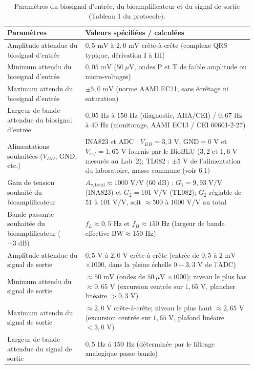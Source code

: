 \documentclass[11pt,letterpaper]{article}
\begin{document}
\begin{table}[H]
\centering
\caption{Paramètres du biosignal d'entrée, du bioamplificateur et du signal de sortie (Tableau 1 du protocole).}
\label{tab:specifications}
\small
\begin{tabular}{p{6.6cm}p{9.0cm}}
\toprule
\textbf{Paramètres} & \textbf{Valeurs spécifiées / calculées} \\
\midrule
Amplitude attendue du biosignal d'entrée & $0,5\text{ mV}$ à $2,0\text{ mV}$ crête-à-crête (complexe QRS typique, dérivation I à III) \\
Minimum attendu du biosignal d'entrée & $0,05\text{ mV}$ ($50\ \mu\text{V}$, ondes P et T de faible amplitude ou micro-voltages) \\
Maximum attendu du biosignal d'entrée & $\pm 5,0\text{ mV}$ (norme AAMI EC11, sans écrêtage ni saturation) \\
Largeur de bande attendue du biosignal d'entrée & $0,05\text{ Hz}$ à $150\text{ Hz}$ (diagnostic, AHA/CEI) / $0,67\text{ Hz}$ à $40\text{ Hz}$ (monitorage, AAMI EC13 / CEI 60601-2-27) \\
Alimentations souhaitées ($V_{DD}$, GND, etc.) & INA823 et ADC : $V_{DD} = 3,3\text{ V}$, $\text{GND} = 0\text{ V}$ et $V_{ref} = 1,65\text{ V}$ fournis par le BioBLU ($3,2$ et $1,6\text{ V}$ mesurés au Lab~2); TL082 : $\pm 5\text{ V}$ de l'alimentation du laboratoire, masse commune (voir 6.1) \\
Gain de tension souhaité du bioamplificateur & $A_{v,\text{total}} \approx 1000\text{ V/V}$ ($60\text{ dB}$) : $G_1 = 9,93\text{ V/V}$ (INA823) et $G_2 = 101\text{ V/V}$ (TL082); $G_2$ réglable de $51$ à $101\text{ V/V}$, soit $\approx 500$ à $1000\text{ V/V}$ au total \\
Bande passante souhaitée du bioamplificateur ($-3\text{ dB}$) & $f_L \approx 0,5\text{ Hz}$ et $f_H \approx 150\text{ Hz}$ (largeur de bande effective $\text{BW} \approx 150\text{ Hz}$) \\
Amplitude attendue du signal de sortie & $0,5\text{ V}$ à $2,0\text{ V}$ crête-à-crête (entrée de $0,5$ à $2\text{ mV}$ $\times 1000$, dans la pleine échelle $0-3,3\text{ V}$ de l'ADC) \\
Minimum attendu du signal de sortie & $\approx 50\text{ mV}$ (ondes de $50\ \mu\text{V}$ $\times 1000$); niveau le plus bas $\approx 0,65\text{ V}$ (excursion centrée sur $1,65\text{ V}$, plancher linéaire $> 0,3\text{ V}$) \\
Maximum attendu du signal de sortie & $\approx 2,0\text{ V}$ crête-à-crête; niveau le plus haut $\approx 2,65\text{ V}$ (excursion centrée sur $1,65\text{ V}$, plafond linéaire $< 3,0\text{ V}$) \\
Largeur de bande attendue du signal de sortie & $0,5\text{ Hz}$ à $150\text{ Hz}$ (déterminée par le filtrage analogique passe-bande) \\
\bottomrule
\end{tabular}
\end{table}
\end{document}
